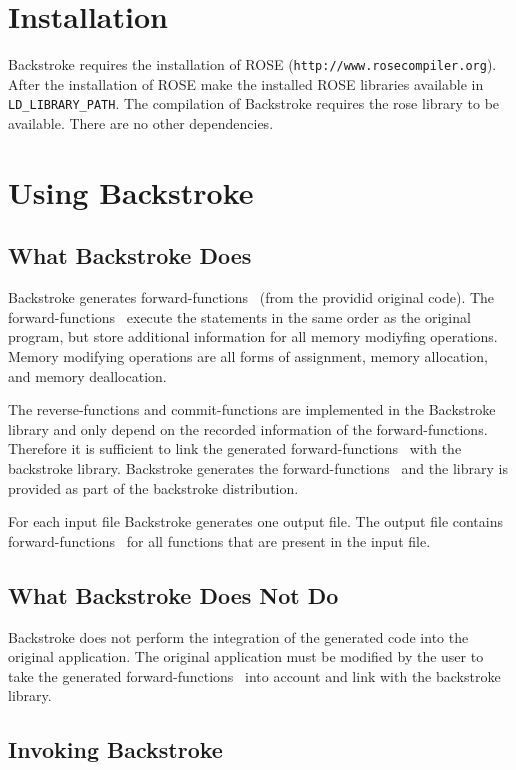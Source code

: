 \documentclass[english,12pt, titlepage]{article}      %
\newcommand{\forwardfunctions}{forward-functions}
\begin{document}
\section{Installation}

Backstroke requires the installation of ROSE (\verb+http://www.rosecompiler.org+).
After the installation of ROSE make the installed ROSE libraries available in \verb+LD_LIBRARY_PATH+.
The compilation of Backstroke requires the rose library to be available. There are no other dependencies.

\section{Using Backstroke}

\subsection{What Backstroke Does}

Backstroke generates \forwardfunctions~ (from the providid original
code). The \forwardfunctions~ execute the statements in the same order as
the original program, but store additional information for all memory
modiyfing operations. Memory modifying operations are all forms of
assignment, memory allocation, and memory deallocation.

The reverse-functions and commit-functions are implemented in the Backstroke
library and only depend on the recorded information of the
\forwardfunctions. Therefore it is sufficient to link the generated
\forwardfunctions~ with the backstroke library. Backstroke generates the
\forwardfunctions~ and the library is provided as part of the backstroke
distribution.

For each input file Backstroke generates one output file. The output
file contains \forwardfunctions~ for all functions that are present in the
input file.

\subsection{What Backstroke Does Not Do}

Backstroke does not perform the integration of the generated code into
the original application. The original application must be modified by
the user to take the generated \forwardfunctions~ into account and link with
the backstroke library.

\subsection{Invoking Backstroke}
\end{document}

